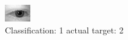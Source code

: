\begin{figure}[h!]
\begin{center}
\includegraphics[width=0.60\columnwidth]{figures/ID356_class_1_target_2.png}
\end{center}
\caption{ Classification: 1 actual target: 2}
\label{fig:ID356_class_1_target_2}
\end{figure}
